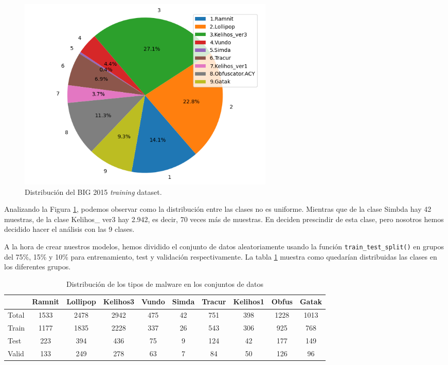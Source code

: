 \begin{figure}[h]
    \begin{center}
    \includegraphics[width=0.6\textwidth]{img/circularMMC.png}
    \end{center}
    \caption{Distribución del BIG 2015 \textit{training} dataset.}
    \label{img: circularMMC}
\end{figure}  

Analizando la Figura \ref{img: circularMMC}, podemos observar como la distribución entre las clases no es uniforme. Mientras que de la clase Simbda hay 42 muestras, de la clase Kelihos\_ ver3 hay 2.942, es decir, 70 veces más de muestras. En \citep{kebede2017classification} deciden prescindir de esta clase, pero nosotros hemos decidido hacer el análisis con las 9 clases. 


A la hora de crear nuestros modelos, hemos dividido el conjunto de datos aleatoriamente usando la función \lstinline|train_test_split()| en grupos del 75\%, 15\% y 10\% para entrenamiento, test y validación respectivamente. La tabla \ref{tab:malware_distribution} muestra como quedarían distribuidas las clases en los diferentes grupos.

\begin{table}[h]
\centering
\begin{tabular}{lccccccccc}
\hline
& Ramnit & Lollipop & Kelihos3 & Vundo & Simda & Tracur & Kelihos1 & Obfus & Gatak \\
\hline
Total & 1533 & 2478 & 2942 & 475 & 42 & 751 & 398 & 1228 & 1013 \\
Train & 1177 & 1835 & 2228 & 337 & 26 & 543 & 306 & 925 & 768 \\
Test & 223 & 394 & 436 & 75 & 9 & 124 & 42 & 177 & 149 \\
Valid & 133 & 249 & 278 & 63 & 7 & 84 & 50 & 126 & 96 \\
\hline
\end{tabular}
\caption{Distribución de los tipos de malware en los conjuntos de datos}
\label{tab:malware_distribution}
\end{table}

